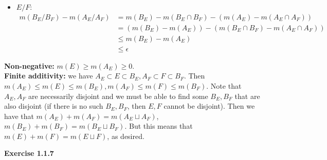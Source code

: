 \documentclass[answers,12pt]{exam}
\begin{document}
\begin{solution}
\begin{itemize}
\[    \]
    \item $E/F$:
    \[
        \begin{aligned}
            m(B_E/B_F)-m(A_E/A_F) &=
            m(B_E)-m(B_E \cap B_F) - (m(A_E)-m(A_E \cap A_F)) \\
            &= (m(B_E)-m(A_E))-(m(B_E \cap B_F)-m(A_E \cap A_F)) \\
            &\leq m(B_E)-m(A_E)\\
            &\leq \epsilon
        \end{aligned}
    \]
\end{itemize}
\textbf{Non-negative:} $m(E) \geq m(A_E) \geq 0$.\\
\textbf{Finite additivity:} we have $A_E \subset E \subset B_E, A_F \subset F \subset B_F$. 
Then $m(A_E) \leq m(E) \leq m(B_E), m(A_F) \leq m(F) \leq m(B_F)$. 
Note that $A_E, A_F$ are necessarily disjoint and we must be able to find some $B_E, B_F$ that are also disjoint (if there is no such $B_E, B_F$, then $E,F$ cannot be disjoint).
Then we have that $m(A_E)+m(A_F) = m(A_E \sqcup A_F)$, $ m(B_E)+m(B_F) = m(B_E \sqcup B_F)$. But this means that $m(E)+m(F)=m(E \sqcup F)$, as desired. 
\end{solution}
\textbf{Exercise 1.1.7}
\end{document}
